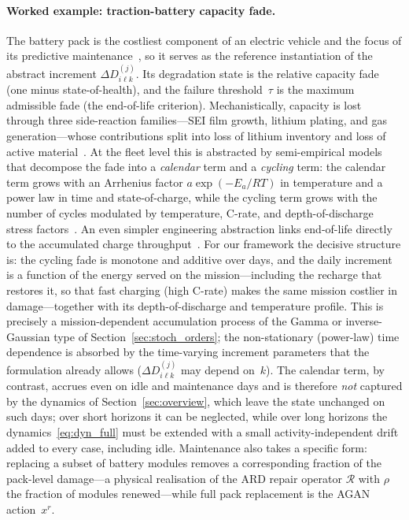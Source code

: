 \documentclass[11pt,a4paper]{article}
\theoremstyle{plain}
\theoremstyle{definition}
\theoremstyle{remark}
\begin{document}
\paragraph{Worked example: traction-battery capacity fade.}
The battery pack is the costliest component of an electric vehicle and the focus of its predictive maintenance~\cite[Secs.~2,~4.2]{Ibrahim2025}, so it serves as the reference instantiation of the abstract increment $\Delta D^{(j)}_{i\ell k}$.
Its degradation state is the relative capacity fade (one minus state-of-health), and the failure threshold~$\tau$ is the maximum admissible fade (the end-of-life criterion).
Mechanistically, capacity is lost through three side-reaction families---SEI film growth, lithium plating, and gas generation---whose contributions split into loss of lithium inventory and loss of active material~\cite[Secs.~2.1,~4.1, Eqs.~28--29]{Lv2025}.
At the fleet level this is abstracted by semi-empirical models that decompose the fade into a \emph{calendar} term and a \emph{cycling} term: the calendar term grows with an Arrhenius factor $a\exp(-E_a/RT)$ in temperature and a power law in time and state-of-charge, while the cycling term grows with the number of cycles modulated by temperature, C-rate, and depth-of-discharge stress factors~\cite[Eqs.~1--3]{Hosen2021}.
An even simpler engineering abstraction links end-of-life directly to the accumulated charge throughput~\cite[Sec.~4.2]{Ibrahim2025}.
For our framework the decisive structure is: the cycling fade is monotone and additive over days, and the daily increment is a function of the energy served on the mission---including the recharge that restores it, so that fast charging (high C-rate) makes the same mission costlier in damage---together with its depth-of-discharge and temperature profile.
This is precisely a mission-dependent accumulation process of the Gamma or inverse-Gaussian type of Section~\ref{sec:stoch_orders}; the non-stationary (power-law) time dependence is absorbed by the time-varying increment parameters that the formulation already allows ($\Delta D^{(j)}_{i\ell k}$ may depend on~$k$).
The calendar term, by contrast, accrues even on idle and maintenance days and is therefore \emph{not} captured by the dynamics of Section~\ref{sec:overview}, which leave the state unchanged on such days; over short horizons it can be neglected, while over long horizons the dynamics~\eqref{eq:dyn_full} must be extended with a small activity-independent drift added to every case, including idle.
Maintenance also takes a specific form: replacing a subset of battery modules removes a corresponding fraction of the pack-level damage---a physical realisation of the ARD repair operator $\mathcal{R}$ with $\rho$ the fraction of modules renewed---while full pack replacement is the AGAN action~$x^r$.
\end{document}
